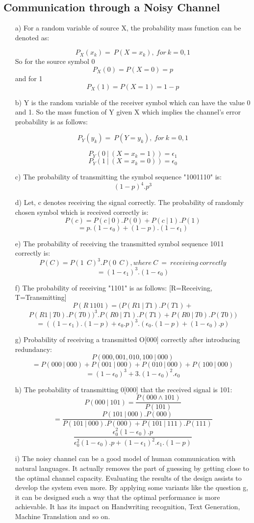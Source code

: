 \documentclass{article}
\begin{document}
\subsection{Communication through a Noisy Channel}
\begin{itemize}
	\item[a)]
	For a random variable of source X, the probability mass function can be denoted as:
	
	$$P_X(x_k)=\ P(X=x_k), \ for\: k={0,1}$$
    So for the source symbol 0 
    $$ P_X(0)=P(X=0)=p$$
    and for 1 
    $$ P_X(1)=P(X=1)=1-p$$
    \item[b)]
	Y is the random variable of the receiver symbol which can have the value 0 and 1. So the mass function of Y given X which implies the channel's error probability  is as follows:
	
	$$P_Y(y_k)=\ P(Y=y_k), \ for\: k={0,1}$$
	
    $$P_Y(0 \: | \:(X=x_k=1))= \epsilon_1$$
    $$P_Y(1 \: | \:(X=x_k=0))= \epsilon_0$$

    \item[c)]
    The probability of transmitting the symbol sequence "1001110" is:
    $$(1-p)^4 . p^3$$
	\item[d)]
	Let, c denotes receiving the signal correctly. The probability of randomly chosen symbol which is received correctly is:
	$$ P(c) = P(c \: | \: 0 ).P(0)+ P(c \: |\:   1).P(1)$$
	$$=p.(1-\epsilon_0)+(1-p).(1-\epsilon_1)$$
	
	\item[e)]
	The probability of receiving the transmitted symbol sequence 1011 correctly is:
	$$ P(C) = P(1\:\: C)^3.P(0\:\: C), where\:C\:=\:receiving \: correctly$$ 
	$$=(1-\epsilon_1)^3.(1-\epsilon_0)$$
	\item[f)]
	The probability of receiving "1101" is as follows: [R=Receiving, T=Transmitting]
	$$P(R\:1101)=(P(R1\:|\:T1).P(T1)+$$ 
	$$P(R1\: |\: T0).P(T0))^3 . P(R0\: | \:T1).P(T1)+
	P(R0\: |\: T0).P(T0))$$
	$$=((1-\epsilon_1).(1-p)+\epsilon_0.p)^3.(\epsilon_0.(1-p)+(1-\epsilon_0).p)$$
	\item[g)]
	Probability of receiving a transmitted O[000] correctly after introducing redundancy:
	$$P(000,001,010,100\:|\:000)$$
	$$=P(000\:|\:000)+P(001\:|\:000)+P(010\:|\:000)+P(100\:|\:000)$$
	$$=(1-\epsilon_0)^3+3.(1-\epsilon_0)^2.\epsilon_0$$
   \item[h)] 
    The probability of transmitting 0[000] that the received signal is 101:
    $$P(000\:|\:101)=\frac{P(000\land101)}{P(101)}$$
    $$=\frac{P(101\:|\:000).P(000)}{P(101\:|\:000).P(000)+P(101\:|\:111).P(111)}$$
    $$ \frac{\epsilon_0^2(1-\epsilon_0).p}{\epsilon_0^2(1-\epsilon_0).p+(1-\epsilon_1)^2.\epsilon_1.(1-p)} $$
	\item[i)]
	The noisy channel can be a good model of human communication with natural languages. It actually removes the part of guessing by getting close to the optimal channel capacity. Evaluating the results of the design assists to develop the system even more. By applying some variants like the question g, it can be designed such a way that the optimal performance is more achievable. It has its impact on Handwriting recognition, Text Generation, Machine Translation and so on.   
\end{itemize}
\end{document}
